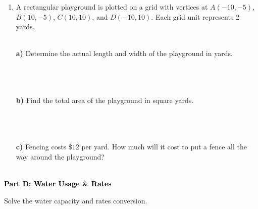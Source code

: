 \documentclass[12pt, letterpaper, fleqn]{article}
\begin{document}
\vspace{5mm}

\begin{enumerate}[itemsep=2.5cm, leftmargin=0.6cm]
\item A rectangular playground is plotted on a grid with vertices at $A(-10, -5)$, $B(10, -5)$, $C(10, 10)$, and $D(-10, 10)$. Each grid unit represents $2$ yards. \\ \\
\vspace{0.2cm}

\textbf{a)} Determine the actual length and width of the playground in yards. \\ \\
 \\ \\
\vspace{2cm}

\textbf{b)} Find the total area of the playground in square yards. \\ \\
 \\ \\
\vspace{2cm}

\textbf{c)} Fencing costs $\$12$ per yard. How much will it cost to put a fence all the way around the playground? \\ \\

\vspace{2cm}
\end{enumerate}

\newpage

\begin{tcolorbox}[colback=black!10]
    \large\textcolor{black}{\textbf{Part D: Water Usage \& Rates}}
\end{tcolorbox}

\vspace{3mm}

\noindent
Solve the water capacity and rates conversion.

\vspace{5mm}
\end{document}
